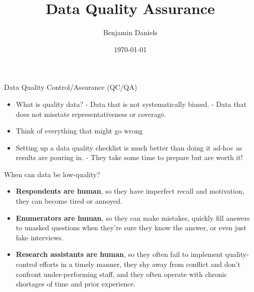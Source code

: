 \documentclass[aspectratio=169]{beamer}
\title{Data Quality Assurance}
\date{\today}
\author{Benjamin Daniels} %
\institute{Development Impact Evaluation (DIME) \newline The World Bank }
\begin{document}
	
{
	\maketitle
}

\begin{frame}{Data Quality Control/Assurance (QC/QA)}
	
	\begin{itemize}[<default overlay specification>]
		\item<1> What is quality data?
			\newline - Data that is not systematically biased.
			\newline - Data that does not misstate representativeness or coverage.
		\item<1> Think of everything that might go wrong
		\item<1> Setting up a data quality checklist is much better than doing it ad-hoc as results are pouring in.
			\newline - They take some time to prepare but are worth it!
	\end{itemize}
	
\end{frame}


\begin{frame}{When can data be low-quality?}
	
	\begin{itemize}[<default overlay specification>]
		\item<1> \textbf{Respondents are human}, so they have imperfect recall and motivation, they can become tired or annoyed.
		\item<1> \textbf{Enumerators are human}, so they can make mistakes, quickly fill answers to unasked questions when they’re sure they know the answer, or even just fake interviews.
		\item<1> \textbf{Research assistants are human}, so they often fail to implement quality-control efforts in a timely manner, they shy away from conflict and don’t confront under-performing staff, and they often operate with chronic shortages of time and prior experience.
	\end{itemize}
	
\end{frame}
\end{document}
